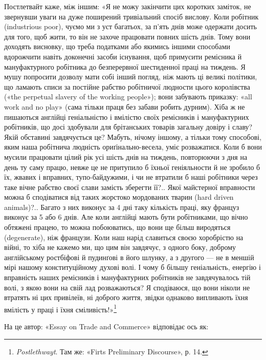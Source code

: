 Постлетвайт каже, між іншим: «Я не можу закінчити цих
коротких заміток, не звернувши уваги на дуже поширений тривіальний
спосіб вислову. Коли робітник (industrious poor), чуємо
ми з уст багатьох, за п’ять днів може одержати досить для того,
щоб жити, то він не захоче працювати повних шість днів. Тому
вони доходять висновку, що треба податками або якимись іншими
способами вдорожчити навіть доконечні засоби існування, щоб
примусити ремісника й мануфактурного робітника до безперервної
шестиденної праці на тиждень. Я мушу попросити дозволу мати
собі інший погляд, ніж мають ці великі політики, що ламають
списи за постійне рабство робітничої людности цього королівства
(«the perpetual slavery of the working people»); вони забувають
приказку: «all work and no play» (сама тільки праця без
забави робить дурним). Хіба ж не пишаються англійці геніальністю
і вмілістю своїх ремісників і мануфактурних робітників,
що досі здобували для брітанських товарів загальну довіру і
славу? Якій обставині завдячується це? Мабуть, нічому іншому,
а тільки тому способові, яким наша робітнича людність ориґінально-весела,
уміє розважатися. Коли б вони мусили працювати
цілий рік усі шість днів на тиждень, повторюючи з дня на день
ту саму працю, невже це не притупило б їхньої геніяльности й не
зробило б їх, жвавих і вправних, тупо-байдужими, і чи не втратили
б наші робітники через таке вічне рабство своєї слави замість
зберегти її?.. Якої майстерної вправности можна б сподіватися
від таких жорстоко мордованих тварин (hard driven animals)?..
Багато з них виконує за 4 дні таку кількість праці, яку француз
виконує за 5 або 6 днів. Але коли англійці мають бути робітниками,
що вічно обтяжені працею, то можна побоюватись, що вони
ще більш виродяться (degenerate), ніж французи. Коли наш нарід
славиться своєю хоробрістю на війні, то хіба не кажемо ми, що
цим він завдячує, з одного боку, доброму англійському ростбіфові
й пудинґові в його шлунку, а з другого — не в меншій мірі
нашому конституційному духові волі. І чому б більшу геніальність,
енергію і вправність наших ремісників і мануфактурних робітників
не завдячувалось тій волі, з якою вони на свій лад розважаються?
Я сподіваюся, що вони ніколи не втратять ні цих
привілеїв, ні доброго життя, звідки однаково випливають їхня
вмілість у праці і їхня сміливість!»\footnote{
\emph{Postlethwayt}. Там же: «Firts Preliminary Discourse», р. 14.
}

На це автор: «Essay on Trade and Commerce» відповідає ось як:
\parbreak{}
